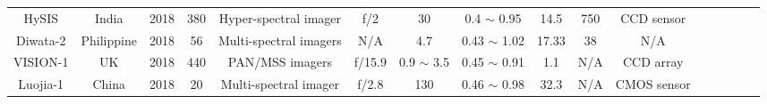 \documentclass[final,5p,times,sort&compress,twocolumn]{elsarticle}
\begin{document}
\begin{table}
{\begin{tabular}{c c c c c c c c c c c c c c c c}
 		   HySIS & India & 2018 & 380 & Hyper-spectral imager & f/2 & 30 & 0.4 $\sim$ 0.95 &  14.5 & 750 &  CCD sensor & \cite{sita2019automatic} \\
 		   Diwata-2 & Philippine & 2018 & 56 & Multi-spectral imagers & N/A & 4.7 & 0.43 $\sim$ 1.02 &  17.33 & 38 & N/A & \cite{violan2021flight}\\ 
 		   VISION-1 & UK & 2018 & 440 & PAN/MSS imagers & f/15.9 & 0.9 $\sim$ 3.5 & 0.45 $\sim$ 0.91 & 1.1 & N/A &CCD array  &\cite{eoportal}\\ 
 		   Luojia-1 & China & 2018 & 20 & Multi-spectral imager & f/2.8 & 130 & 0.46 $\sim$ 0.98 &  32.3 &  N/A & CMOS sensor & \cite{jiang2018potentiality} \\
 		  	    	    	    	                      	       	    	    	    	        	           		    		      		       	    
		\hline
		\end{tabular}
	}
\label{table:nonlin} %
\end{table}
\end{document}
